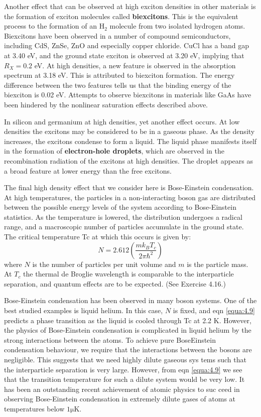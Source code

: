 \documentclass[12pt]{book}
\begin{document}
Another effect that can be observed at high exciton densities in other materials is the formation of exciton molecules called \textbf{biexcitons}. This is the equivalent process to the formation of an $\mathrm{H_2}$ molecule from two isolated hydrogen atoms. Biexcitons have been observed in a number of compound semiconductors, including CdS, ZnSe, ZnO and especially copper chloride. CuCl has a band gap at 3.40 eV, and the ground state exciton is observed at 3.20 eV, implying that $R_X = 0.2$ eV. At high densities, a new feature is observed in the absorption spectrum at 3.18 eV. This is attributed to biexciton formation. The energy difference between the two features tells us that the binding energy of the biexciton is 0.02 eV. Attempts to observe biexcitons in materials like GaAs have been hindered by the nonlinear saturation effects described above.

In silicon and germanium at high densities, yet another effect occurs. At low densities the excitons may be considered to be in a gaseous phase. As the density increases, the excitons condense to form a liquid. The liquid phase manifests itself in the formation of \textbf{electron-hole droplets}, which are observed in the recombination radiation of the excitons at high densities. The droplet appears as a broad feature at lower energy than the free excitons.

The final high density effect that we consider here is Bose-Einstein condensation. At high temperatures, the particles in a non-interacting boson gas are distributed between the possible energy levels of the system according to Bose-Einstein statistics. As the temperature is lowered, the distribution undergoes a radical range, and a macroscopic number of particles accumulate in the ground state. The critical temperature Tc at which this occurs is given by:
\begin{equation}\label{equa:4.9}
  N=2.612\left(\frac{mk_BT_c}{2\pi\hbar^2}\right)
\end{equation}
where $N$ is the number of particles per unit volume and $m$ is the particle mass. At $T_c$ the thermal de Broglie wavelength is comparable to the interparticle separation, and quantum effects are to be expected. (See Exercise 4.16.)

Bose-Einstein condensation has been observed in many boson systems. One of the best studied examples is liquid helium. In this case, $N$ is fixed, and eqn \ref{equa:4.9} predicts a phase transition as the liquid is cooled through Tc at 2.2 K. However, the physics of Bose-Einstein condensation is complicated in liquid helium by the strong interactions between the atoms. To achieve pure Bose­Einstein condensation behaviour, we require that the interactions between the bosons are negligible. This suggests that we need highly dilute gaseous sys­ tems such that the interparticle separation is very large. However, from eqn \ref{equa:4.9} we see that the transition temperature for such a dilute system would be very low. It has been an outstanding recent achievement of atomic physics to suc­ ceed in observing Bose-Einstein condensation in extremely dilute gases of atoms at temperatures below $1\mathrm{\mu K}$.
\end{document}

